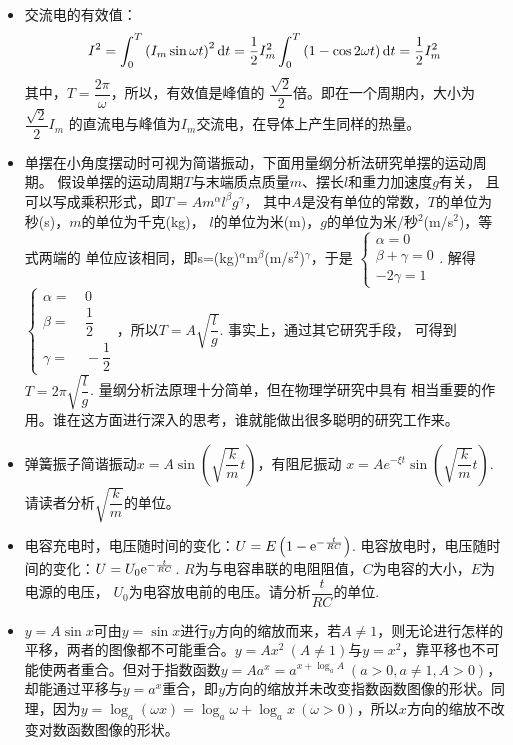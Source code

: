 \begin{itemize}[leftmargin=\inteval{\myitemleftmargin}pt,itemsep=
   \inteval{\myitemitempsep}pt,topsep=\inteval{\myitemtopsep}pt]
\item 交流电的有效值：
\begin{gather*}
I^2=\int_{0}^{T}\left( I_m\sin \omega t\right)^2 \mathrm{d} t
=\dfrac{1}{2}I_m^2 \int_{0}^{T}\left( 1-\cos 2\omega t\right) \mathrm{d} t
=\dfrac{1}{2}I_m^2
\end{gather*}
其中，$ T=\dfrac{2\pi}{\omega} $，所以，有效值是峰值的
$ \dfrac{\sqrt{2}}{2} $倍。即在一个周期内，大小为$ \dfrac{\sqrt{2}}{2}I_m $
的直流电与峰值为$ I_m $交流电，在导体上产生同样的热量。

\item 单摆在小角度摆动时可视为简谐振动，下面用量纲分析法研究单摆的运动周期。
假设单摆的运动周期$ T $与末端质点质量$ m $、摆长$ l $和重力加速度$ g $有关，
且可以写成乘积形式，即$ T=Am^{\alpha}l^{\beta}g^{\gamma} $，
其中$ A $是没有单位的常数，$ T $的单位为秒(s)，$ m $的单位为千克(kg)，
$ l $的单位为米(m)，$ g $的单位为米/秒$ ^2 $(m/s$ ^2 $)，等式两端的
单位应该相同，即s=(kg)$ ^\alpha $m$ ^\beta $(m/s$ ^2 $)$ ^\gamma $，于是
$ \begin{cases}
    \alpha=0 \\
    \beta+\gamma =0 \\
    -2\gamma =1
\end{cases} $. 解得
$ \begin{cases}
    \alpha=&\ 0 \\
    \beta=&\ \dfrac{1}{2} \\
    \gamma =&\ -\dfrac{1}{2}
\end{cases} $，所以$ T=A\sqrt{\dfrac{l}{g}} $. 事实上，通过其它研究手段，
可得到$ T=2\pi \sqrt{\dfrac{l}{g}} $. 量纲分析法原理十分简单，但在物理学研究中具有
相当重要的作用。谁在这方面进行深入的思考，谁就能做出很多聪明的研究工作来。

\item 弹簧振子简谐振动$ x=A\sin\left( \sqrt{\dfrac{k}{m}}t\right) $，有阻尼振动
$ x=Ae^{-\xi t}\sin\left( \sqrt{\dfrac{k}{m}}t\right) $. 
请读者分析$ \sqrt{\dfrac{k}{m}} $的单位。

\item 电容充电时，电压随时间的变化：$ U=E\left(1-\mathrm{e}^{-\frac{t}{RC}} \right) $. 
电容放电时，电压随时间的变化：$ U=U_0\mathrm{e}^{-\frac{t}{RC}}$.
$ R $为与电容串联的电阻阻值，$ C $为电容的大小，$ E $为电源的电压，
$ U_0 $为电容放电前的电压。请分析$ \dfrac{t}{RC} $的单位.

\item $ y=A\sin x $可由$ y=\sin x $进行$ y $方向的缩放而来，若$ A\neq 1 $，则无论进行怎样的平移，两者的图像都不可能重合。$ y=Ax^2\ (A\neq 1) $与$ y=x^2 $，靠平移也不可能使两者重合。但对于指数函数$ y=Aa^x=a^{x+\log_a A}\ (a>0,a\neq 1,A>0) $，却能通过平移与$ y=a^x $重合，即$ y $方向的缩放并未改变指数函数图像的形状。同理，因为$ y=\log_a(\omega x)=\log_a \omega+\log_a x \ (\omega>0) $，所以$ x $方向的缩放不改变对数函数图像的形状。


\end{itemize}
